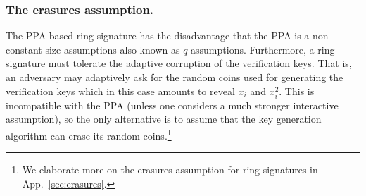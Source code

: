  

\subsubsection{The erasures assumption.}
The PPA-based ring signature has the disadvantage that the PPA is a non-constant size assumptions also known as $q$-assumptions. Furthermore, a ring signature must tolerate the adaptive corruption of the verification keys. That is, an adversary may adaptively ask for the random coins used for generating the verification keys which in this case amounts to reveal $x_i$ and $x_i^2$. This is incompatible with the PPA (unless one considers a much stronger interactive assumption), so the only alternative is to assume that the key generation algorithm can erase its random coins.\footnote{We elaborate more on the erasures assumption for ring signatures in App.~\ref{sec:erasures}.}

